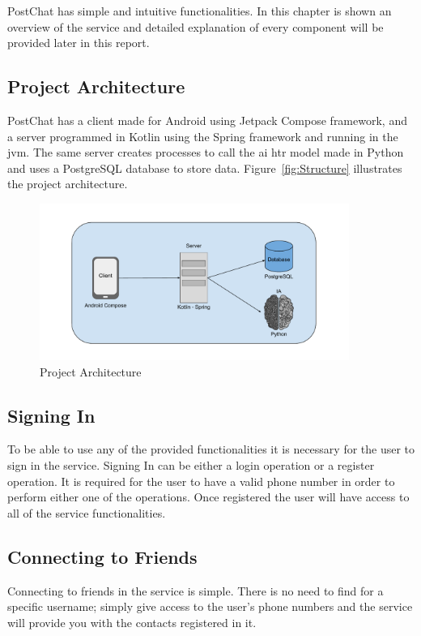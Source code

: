 PostChat has simple and intuitive functionalities. In this chapter is shown an overview of the service and detailed explanation of every component will be provided later in this report.

\subsection{Project Architecture}
PostChat has a client made for Android using Jetpack Compose framework, and a server programmed in Kotlin using the Spring framework and running in the \gls{jvm}. The same server creates processes to call the \gls{ai} \gls{htr} model made in Python and uses a PostgreSQL database to store data. 
Figure~\ref{fig:Structure} illustrates the project architecture.

\begin{figure}[!ht]
	\centering
	\includegraphics[width=0.9\textwidth]{./Chapter3/Figures/Project Structure}
	\caption{Project Architecture}
	\label{fig:PStruct}
\end{figure}


\subsection{Signing In}
To be able to use any of the provided functionalities it is necessary for the user to sign in the service. Signing In can be either a login operation or a register operation. It is required for the user to have a valid phone number in order to perform either one of the operations.
Once registered the user will have access to all of the service functionalities.

\subsection{Connecting to Friends}
Connecting to friends in the service is simple. There is no need to find for a specific username; simply give access to the user's phone numbers and the service will provide you with the contacts registered in it.   


